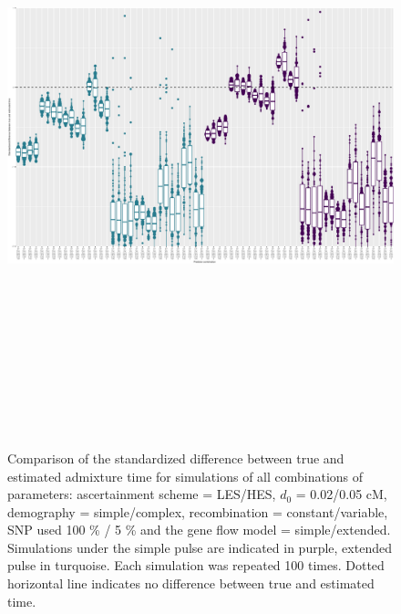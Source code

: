 \documentclass[11pt]{article}
\begin{document}
\begin{figure}
\centering
\includegraphics[width=16cm,height=18cm,keepaspectratio]{ATE_Revisions_files/figure-latex/figS2_updated_SP-1.pdf}
\caption{\label{fig:figSGLM_data_SP} Comparison of the standardized difference between true and estimated admixture time for simulations of all combinations of parameters: ascertainment scheme = LES/HES,  $d_{0}$ = 0.02/0.05 cM, demography = simple/complex, recombination = constant/variable, SNP used 100 \% / 5 \% and the gene flow model = simple/extended. Simulations under the simple pulse are indicated in purple, extended pulse in turquoise. Each simulation was repeated 100 times. Dotted horizontal line indicates no difference between true and estimated time.}
\end{figure}
\end{document}
